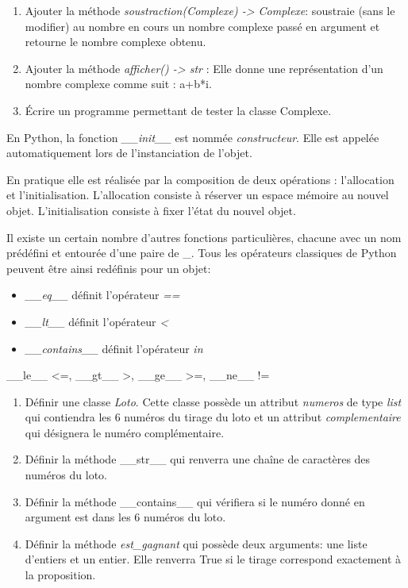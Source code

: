 \documentclass[a4paper,11pt]{article}
\begin{document}
\begin{Form}
\begin{exo}
\begin{enumerate}
\item Ajouter la méthode \emph{soustraction(Complexe) -> Complexe}: soustraie (sans le modifier) au nombre en cours un nombre complexe passé en argument et retourne le nombre complexe obtenu.
\item Ajouter la méthode \emph{afficher() -> str} : Elle donne une représentation d'un nombre complexe comme suit : a+b*i.
\item Écrire un programme permettant de tester la classe Complexe.
\end{enumerate}
\end{exo}
\begin{exo}
En Python, la fonction \emph{\_\_init\_\_} est nommée \emph{constructeur}. Elle est appelée automatiquement lors de l'instanciation de l'objet.
\begin{commentprof}
En pratique elle est réalisée par la composition de deux opérations : l'allocation et l'initialisation. L'allocation consiste à réserver un espace mémoire au nouvel objet. L'initialisation consiste à fixer l'état du nouvel objet. 
\end{commentprof}
Il existe un certain nombre d'autres fonctions particulières, chacune avec un nom prédéfini et entourée d'une paire de \_.
Tous les opérateurs classiques de Python peuvent être ainsi redéfinis pour un objet:
\begin{itemize}
\item \emph{\_\_eq\_\_} définit l'opérateur \emph{==}
\item \emph{\_\_lt\_\_} définit l'opérateur \emph{<}
\item \emph{\_\_contains\_\_} définit l'opérateur \emph{in}
\end{itemize}
\begin{commentprof}
\_\_le\_\_ <=, \_\_gt\_\_ >, \_\_ge\_\_ >=, \_\_ne\_\_ !=
\end{commentprof}
\begin{enumerate}
\item Définir une classe \emph{Loto}. Cette classe possède un attribut \emph{numeros} de type \emph{list} qui contiendra les 6 numéros du tirage du loto et un attribut \emph{complementaire} qui désignera le numéro complémentaire.
\item Définir la méthode \_\_str\_\_ qui renverra une chaîne de caractères des numéros du loto.
\item Définir la méthode \_\_contains\_\_ qui vérifiera si le numéro donné en argument est dans les 6 numéros du loto.
\item Définir la méthode \emph{est\_gagnant} qui possède deux arguments: une liste d'entiers et un entier. Elle renverra True si le tirage correspond exactement à la proposition.

\end{enumerate}
\end{exo}
\end{Form}
\end{document}
